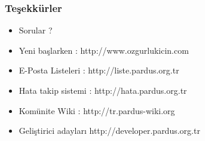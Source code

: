 \documentclass{beamer}
\begin{document}
\frame
{
	\frametitle{Teşekkürler}
	\begin{itemize}
        \item Sorular ?
	\end{itemize}

	\begin{itemize}
        \item Yeni başlarken : http://www.ozgurlukicin.com
        \item E-Posta Listeleri : http://liste.pardus.org.tr
        \item Hata takip sistemi : http://hata.pardus.org.tr
        \item Komünite Wiki : http://tr.pardus-wiki.org
        \item Geliştirici adayları http://developer.pardus.org.tr
	\end{itemize}

}
\end{document}
